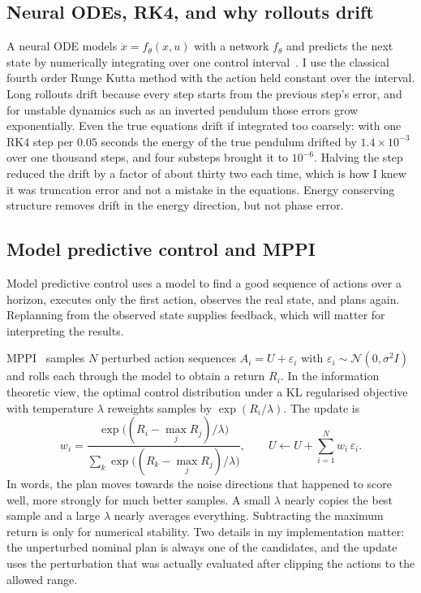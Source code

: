 \documentclass[11pt,a4paper]{article}
\begin{document}
\subsection{Neural ODEs, RK4, and why rollouts drift}
A neural ODE models $\dot x=f_\theta(x,u)$ with a network $f_\theta$ and predicts the next state by numerically integrating over one control interval~\cite{chen2018neuralode}. I use the classical fourth order Runge Kutta method with the action held constant over the interval. Long rollouts drift because every step starts from the previous step's error, and for unstable dynamics such as an inverted pendulum those errors grow exponentially. Even the true equations drift if integrated too coarsely: with one RK4 step per $0.05$ seconds the energy of the true pendulum drifted by $1.4\times10^{-3}$ over one thousand steps, and four substeps brought it to $10^{-6}$. Halving the step reduced the drift by a factor of about thirty two each time, which is how I knew it was truncation error and not a mistake in the equations. Energy conserving structure removes drift in the energy direction, but not phase error.

\subsection{Model predictive control and MPPI}
Model predictive control uses a model to find a good sequence of actions over a horizon, executes only the first action, observes the real state, and plans again. Replanning from the observed state supplies feedback, which will matter for interpreting the results.

MPPI~\cite{williams2017mppi,williams2016aggressive} samples $N$ perturbed action sequences $A_i=U+\varepsilon_i$ with $\varepsilon_i\sim\mathcal N(0,\sigma^2 I)$ and rolls each through the model to obtain a return $R_i$. In the information theoretic view, the optimal control distribution under a KL regularised objective with temperature $\lambda$ reweights samples by $\exp(R_i/\lambda)$. The update is
\begin{equation}
w_i=\frac{\exp\!\big((R_i-\max_j R_j)/\lambda\big)}{\sum_k\exp\!\big((R_k-\max_j R_j)/\lambda\big)},\qquad
U\leftarrow U+\sum_{i=1}^N w_i\,\varepsilon_i .
\end{equation}
In words, the plan moves towards the noise directions that happened to score well, more strongly for much better samples. A small $\lambda$ nearly copies the best sample and a large $\lambda$ nearly averages everything. Subtracting the maximum return is only for numerical stability. Two details in my implementation matter: the unperturbed nominal plan is always one of the candidates, and the update uses the perturbation that was actually evaluated after clipping the actions to the allowed range.
\end{document}
